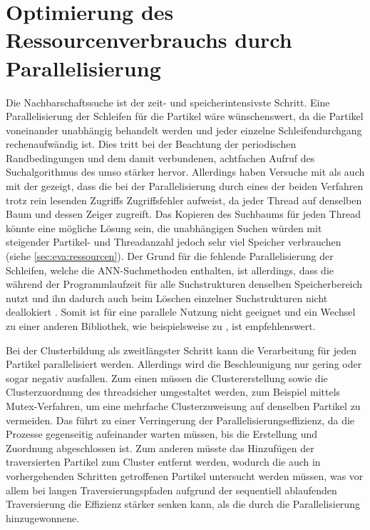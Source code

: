 \section{Optimierung des Ressourcenverbrauchs durch Parallelisierung}\label{sec:disc:optimierung-para}
Die Nachbarschaftssuche ist der zeit- und speicherintensivste Schritt. Eine Parallelisierung der Schleifen für die Partikel wäre wünschenswert, da die Partikel voneinander unabhängig behandelt werden und jeder einzelne Schleifendurchgang rechenaufwändig ist. Dies tritt bei der Beachtung der periodischen Randbedingungen und dem damit verbundenen, achtfachen Aufruf des Suchalgorithmus des  umso stärker hervor. Allerdings haben Versuche mit  als auch mit der \PPL gezeigt, dass die \ANN bei der Parallelisierung durch eines der beiden Verfahren trotz rein lesenden Zugriffs Zugriffsfehler aufweist, da jeder Thread auf denselben Baum und dessen Zeiger zugreift. Das Kopieren des Suchbaums für jeden Thread könnte eine mögliche Lösung sein, die unabhängigen Suchen würden mit steigender Partikel- und Threadanzahl jedoch sehr viel Speicher verbrauchen (siehe \autoref{sec:eva:ressourcen}).
Der Grund für die fehlende Parallelisierung der Schleifen, welche die \gls{ANN}-Suchmethoden enthalten, ist allerdings, dass die \ANN während der Programmlaufzeit für alle Suchstrukturen denselben Speicherbereich nutzt und ihn dadurch auch beim Löschen einzelner Suchstrukturen nicht deallokiert \cite[S.~8]{mount2010ann}. Somit ist \ANN für eine parallele Nutzung nicht geeignet und ein Wechsel zu einer anderen Bibliothek, wie beispielsweise zu \FLANN \cite{ohara2013annAlgo} \cite{wijewardena2014annPerformance}, ist empfehlenswert.

Bei der Clusterbildung als zweitlängster Schritt kann die Verarbeitung für jeden Partikel parallelisiert werden. Allerdings wird die Beschleunigung nur gering oder sogar negativ ausfallen. Zum einen müssen die Clustererstellung sowie die Clusterzuordnung des  threadsicher umgestaltet werden, zum Beispiel mittels Mutex-Verfahren, um eine mehrfache Clusterzuweisung auf denselben Partikel zu vermeiden. Das führt zu einer Verringerung der Parallelisierungseffizienz, da die Prozesse gegenseitig aufeinander warten müssen, bis die Erstellung und Zuordnung abgeschlossen ist. Zum anderen müsste das Hinzufügen der traversierten Partikel zum Cluster entfernt werden, wodurch die auch in vorhergehenden Schritten getroffenen Partikel untersucht werden müssen, was vor allem bei langen Traversierungspfaden aufgrund der sequentiell ablaufenden Traversierung die Effizienz stärker senken kann, als die durch die Parallelisierung hinzugewonnene.

